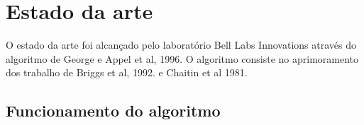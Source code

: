 \section{Estado da arte}

O estado da arte foi alcançado pelo laboratório Bell Labs Innovations através do algoritmo de George e Appel et al, 1996.
O algoritmo consiste no aprimoramento dos trabalho de Briggs et al, 1992. e Chaitin et al 1981.

\subsection{Funcionamento do algoritmo}
